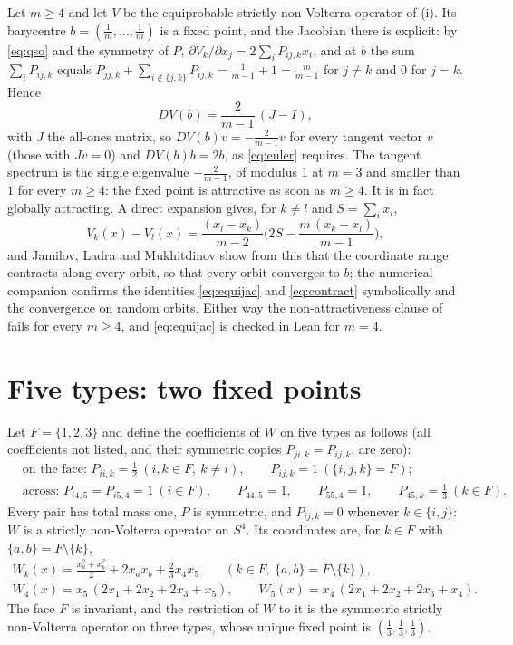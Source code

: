 \documentclass[11pt]{amsart}
\theoremstyle{definition}
\begin{document}
Let $m\ge4$ and let $V$ be the equiprobable strictly non-Volterra operator of (i). Its barycentre $b=(\frac1m,\dots,\frac1m)$ is a fixed point, and the Jacobian there is explicit: by \eqref{eq:qso} and the symmetry of $P$, $\partial V_k/\partial x_j=2\sum_iP_{ij,k}x_i$, and at $b$ the sum $\sum_iP_{ij,k}$ equals $P_{jj,k}+\sum_{i\notin\{j,k\}}P_{ij,k}=\frac1{m-1}+1=\frac{m}{m-1}$ for $j\ne k$ and $0$ for $j=k$. Hence
\begin{equation}\label{eq:equijac}
DV(b)=\frac{2}{m-1}\,(J-I),
\end{equation}
with $J$ the all-ones matrix, so $DV(b)v=-\frac{2}{m-1}v$ for every tangent vector $v$ (those with $Jv=0$) and $DV(b)b=2b$, as \eqref{eq:euler} requires. The tangent spectrum is the single eigenvalue $-\frac2{m-1}$, of modulus $1$ at $m=3$ and smaller than $1$ for every $m\ge4$: the fixed point is attractive as soon as $m\ge4$. It is in fact globally attracting. A direct expansion gives, for $k\ne l$ and $S=\sum_ix_i$,
\begin{equation}\label{eq:contract}
V_k(x)-V_l(x)=\frac{(x_l-x_k)}{m-2}\Big(2S-\frac{m\,(x_k+x_l)}{m-1}\Big),
\end{equation}
and Jamilov, Ladra and Mukhitdinov \cite{JLM17} show from this that the coordinate range contracts along every orbit, so that every orbit converges to $b$; the numerical companion confirms the identities \eqref{eq:equijac} and \eqref{eq:contract} symbolically and the convergence on random orbits. Either way the non-attractiveness clause of  fails for every $m\ge4$, and \eqref{eq:equijac} is checked in Lean for $m=4$.

\section{Five types: two fixed points}\label{sec:five}

Let $F=\{1,2,3\}$ and define the coefficients of $W$ on five types as follows (all coefficients not listed, and their symmetric copies $P_{ji,k}=P_{ij,k}$, are zero):
\begin{align*}
&\text{on the face: } P_{ii,k}=\tfrac12\ (i,k\in F,\ k\ne i),\qquad P_{ij,k}=1\ (\{i,j,k\}=F);\\
&\text{across: } P_{i4,5}=P_{i5,4}=1\ (i\in F),\qquad P_{44,5}=1,\qquad P_{55,4}=1,\qquad P_{45,k}=\tfrac13\ (k\in F).
\end{align*}
Every pair has total mass one, $P$ is symmetric, and $P_{ij,k}=0$ whenever $k\in\{i,j\}$: $W$ is a strictly non-Volterra operator on $S^4$. Its coordinates are, for $k\in F$ with $\{a,b\}=F\setminus\{k\}$,
\begin{equation}\label{eq:W}
\begin{gathered}
W_k(x)=\frac{x_a^2+x_b^2}{2}+2x_ax_b+\frac23x_4x_5\qquad(k\in F,\ \{a,b\}=F\setminus\{k\}),\\
W_4(x)=x_5\,(2x_1+2x_2+2x_3+x_5),\qquad W_5(x)=x_4\,(2x_1+2x_2+2x_3+x_4).
\end{gathered}
\end{equation}
The face $F$ is invariant, and the restriction of $W$ to it is the symmetric strictly non-Volterra operator on three types, whose unique fixed point is $(\frac13,\frac13,\frac13)$.
\end{document}
